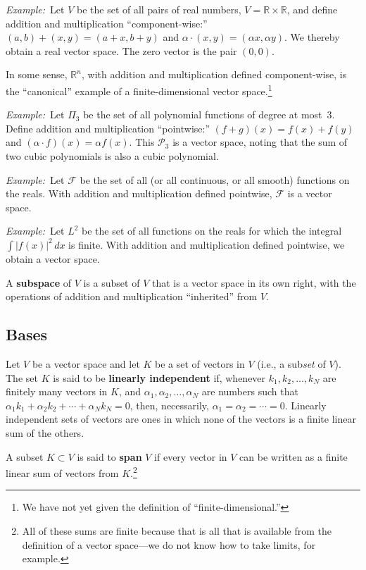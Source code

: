 \documentclass[10pt, a4paper, twocolumn]{article}
\newcommand{\R}{\mathbb{R}}
\newcommand{\defn}[1]{\textbf{#1}}
\newcommand{\eg}{\emph{Example:}\relax}
\begin{document}
\eg\ Let $V$ be the set of all pairs of real numbers, $V = \R \times \R$, and define addition and
multiplication “component-wise:” $(a, b) + (x, y) = (a + x, b + y)$ and $\alpha \cdot (x, y) = (\alpha x, \alpha y)$. We
thereby obtain a real vector space. The zero vector is the pair $(0, 0)$.

In some sense, $\R^n$, with addition and multiplication defined component-wise, is the “canonical”
example of a finite-dimensional vector space.\footnote{We have not yet given the definition of
  “finite-dimensional.”}

\eg\ Let $\Pi_3$ be the set of all polynomial functions of degree at most~3. Define addition and
multiplication “pointwise:” $(f + g)(x) = f(x) + f(y)$ and $(\alpha \cdot f)(x) = \alpha f(x)$. This $\mathcal{P}_3$ is a vector
space, noting that the sum of two cubic polynomials is also a cubic polynomial.

\eg\ Let $\mathcal{F}$ be the set of all (or all continuous, or all smooth) functions on the reals. With
addition and multiplication defined pointwise, $\mathcal{F}$ is a vector space.

\eg\ Let $L^2$ be the set of all functions on the reals for which the integral $\int |f(x)|^2\,dx$
is finite. With addition and multiplication defined pointwise, we obtain a vector space.  

A \defn{subspace} of $V$ is a subset of $V$ that is a vector space in its own right, with the
operations of addition and multiplication “inherited” from $V$.


\subsection{Bases}
Let $V$ be a vector space and let $K$ be a set of vectors in $V$ (i.e., a sub\emph{set} of $V$). The
set $K$ is said to be \defn{linearly independent} if, whenever $k_1, k_2, \dotsc, k_N$ are finitely
many vectors in $K$, and $\alpha_1, \alpha_2, \dotsc, \alpha_N$ are numbers such that $\alpha_1 k_1 + \alpha_2 k_2 + \dotsb +
\alpha_N k_N = 0$, then, necessarily, $\alpha_1 = \alpha_2 = \dotsb = 0$. Linearly independent sets of vectors are
ones in which none of the vectors is a finite linear sum of the others.

A subset $K \subset V$ is said to \defn{span} $V$ if every vector in $V$ can be written as a finite linear sum
of vectors from $K$.\footnote{All of these sums are finite because that is all that is available from
  the definition of a vector space---we do not know how to take limits, for example.}
\end{document}
